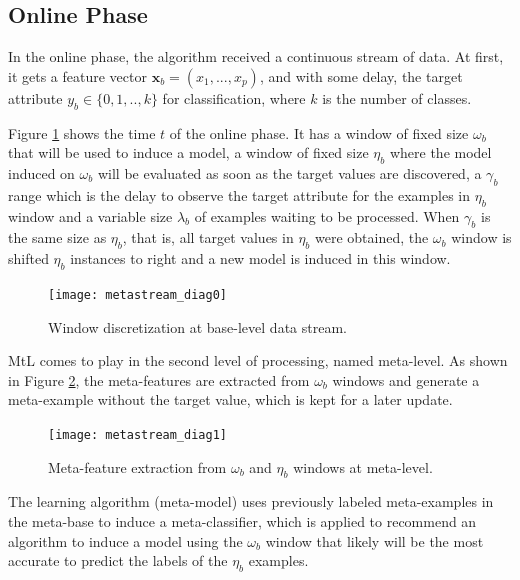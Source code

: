 \subsection{Online Phase}
\label{subsec:online}

In the online phase, the algorithm received a continuous stream of data. 
At first, it gets a feature vector  %
$\boldsymbol{x}_b = (x_1,...,x_p)$, and with some delay, the target attribute $y_b \in \{0,1,..,k\}$ for classification, where $k$ is the number of classes.

Figure \ref{fig:ms_diagram0} shows the time $t$ of the online phase. 
It has a window of fixed size $\omega_b$ that will be used to induce a model, a window of fixed size $\eta_b$ where the model induced on $\omega_b$ will be evaluated as soon as the target values are discovered, a $\gamma_b$ range which is the delay to observe the target attribute for the examples in $\eta_b$ window and a variable size $\lambda_b$ of examples waiting to be processed.
When $\gamma_b$ is the same size as $\eta_b$, that is, all target values in $\eta_b$ were obtained, the $\omega_b$ window is shifted $\eta_b$ instances to right and a new model is induced in this window.

\begin{figure}[ht]
    \centering
    \texttt{[image: metastream\_diag0]}
    \caption{Window discretization at base-level data stream.}
    \label{fig:ms_diagram0}
\end{figure}

MtL comes to play in the second level of processing, named meta-level. As shown in Figure \ref{fig:ms_diagram1}, the meta-features are extracted from $\omega_b$ windows and generate a meta-example without the target value, which is kept for a later update. 

\begin{figure}[ht]
    \centering
    \texttt{[image: metastream\_diag1]}
    \caption{Meta-feature extraction from $\omega_b$ and $\eta_b$ windows at meta-level.}
    \label{fig:ms_diagram1}
\end{figure}

The learning algorithm (meta-model) uses previously labeled meta-examples in the meta-base to induce a meta-classifier, which is applied to recommend an algorithm to induce a model using the $\omega_b$ window that likely will be the most accurate to  predict the labels of the $\eta_b$ examples.
 




